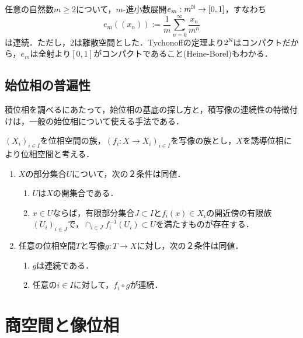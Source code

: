 \documentclass[uplatex,dvipdfmx]{jsreport}
\begin{document}
\begin{example}[$m$-進小数展開]
    任意の自然数$m\ge 2$について，$m$-進小数展開$e_m:m^{\mathbb{N}}\to[0,1]$，すなわち
    \[e_m((x_n)):=\frac{1}{m}\sum^\infty_{n=0}\frac{x_n}{m^n}\]
    は連続．ただし，$2$は離散空間とした．Tychonoffの定理より$2^{\mathbb{N}}$はコンパクトだから，$e_m$は全射より$[0,1]$がコンパクトであること(Heine-Borel)もわかる．
\end{example}

\subsection{始位相の普遍性}

\begin{tcolorbox}[colframe=ForestGreen, colback=ForestGreen!10!white,breakable,colbacktitle=ForestGreen!40!white,coltitle=black,fonttitle=\bfseries\sffamily,
title=]
    積位相を調べるにあたって，始位相の基底の探し方と，積写像の連続性の特徴付けは，一般の始位相について使える手法である．
\end{tcolorbox}

\begin{proposition}[誘導位相の普遍性]\label{prop-universality-of-final-topology}
    $(X_i)_{i\in I}$を位相空間の族，$(f_i:X\to X_i)_{i\in I}$を写像の族とし，$X$を誘導位相により位相空間と考える．
    \begin{enumerate}
        \item $X$の部分集合$U$について，次の２条件は同値．
        \begin{enumerate}[(1)]
            \item $U$は$X$の開集合である．
            \item $x\in U$ならば，有限部分集合$J\subset I$と$f_i(x)\in X_i$の開近傍の有限族$(U_i)_{i\in J}$で，$\cap_{i\in J}f^{-1}_i(U_i)\subset U$を満たすものが存在する．
        \end{enumerate}
        \item 任意の位相空間$T$と写像$g:T\to X$に対し，次の２条件は同値．
        \begin{enumerate}[(1)]
            \item $g$は連続である．
            \item 任意の$i\in I$に対して，$f_i\circ g$が連続．
        \end{enumerate}
    \end{enumerate}
\end{proposition}

\section{商空間と像位相}
\end{document}
